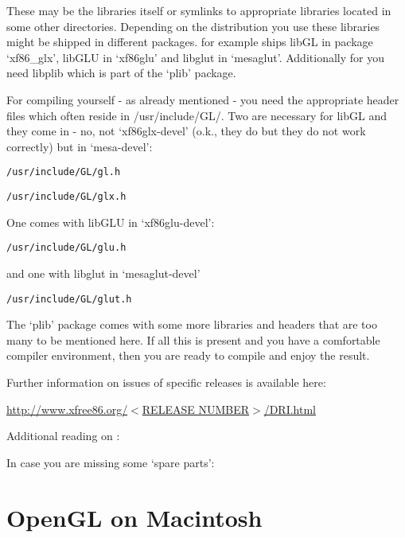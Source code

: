 These may be the libraries itself or symlinks to appropriate libraries
located in some other directories. Depending on the distribution you use
these libraries might be shipped in different packages.  for example
ships libGL in package `xf86\_glx', libGLU in `xf86glu' and libglut in
`mesaglut'. Additionally for \FlightGear{} you need libplib which is part of
the `plib' package.

For compiling \FlightGear{} yourself - as already mentioned - you need the
appropriate header files which often reside in /usr/include/GL/. Two are
necessary for libGL and they come in - no, not `xf86glx-devel' (o.k., they
do but they do not work correctly) but in `mesa-devel':
\medskip

\texttt{/usr/include/GL/gl.h}

\texttt{/usr/include/GL/glx.h}
\medskip

\noindent
One comes with libGLU in `xf86glu-devel':
\medskip

\texttt{/usr/include/GL/glu.h}
\medskip

and one with libglut in `mesaglut-devel'
\medskip

\texttt{/usr/include/GL/glut.h}
\medskip

The `plib' package comes with some more libraries and headers that are too
many to be mentioned here. If all this is present and you have a comfortable
compiler environment, then you are ready to compile \FlightGear{} and enjoy the
result.


Further information on  issues of specific  releases is
available here:
\medskip

\underline{http://www.xfree86.org/{$<$}RELEASE NUMBER{$>$}/DRI.html}

\medskip

\noindent
Additional reading on :
\medskip

\medskip

\noindent
In case you are missing some `spare parts':
\medskip



\section{OpenGL on Macintosh}

